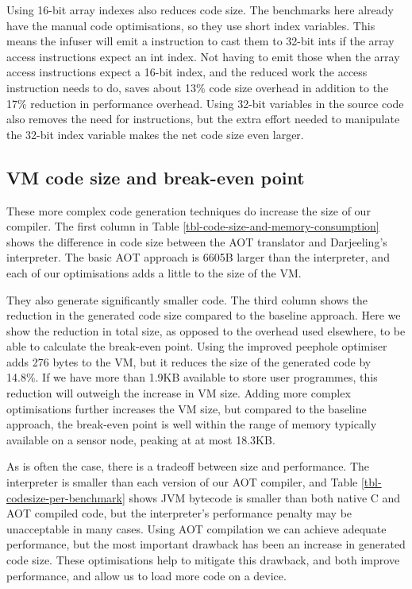 Using 16-bit array indexes also reduces code size. The benchmarks here already have the manual code optimisations, so they use short index variables. This means the infuser will emit a  instruction to cast them to 32-bit ints if the array access instructions expect an int index. Not having to emit those when the array access instructions expect a 16-bit index, and the reduced work the access instruction needs to do, saves about 13\% code size overhead in addition to the 17\% reduction in performance overhead. Using 32-bit variables in the source code also removes the need for  instructions, but the extra effort needed to manipulate the 32-bit index variable makes the net code size even larger.

\subsection{VM code size and break-even point}
These more complex code generation techniques do increase the size of our compiler. The first column in Table \ref{tbl-code-size-and-memory-consumption} shows the difference in code size between the AOT translator and Darjeeling's interpreter. The basic AOT approach is 6605B larger than the interpreter, and each of our optimisations adds a little to the size of the VM.

They also generate significantly smaller code. The third column shows the reduction in the generated code size compared to the baseline approach. Here we show the reduction in total size, as opposed to the overhead used elsewhere, to be able to calculate the break-even point. Using the improved peephole optimiser adds 276 bytes to the VM, but it reduces the size of the generated code by 14.8\%. If we have more than 1.9KB available to store user programmes, this reduction will outweigh the increase in VM size. Adding more complex optimisations further increases the VM size, but compared to the baseline approach, the break-even point is well within the range of memory typically available on a sensor node, peaking at at most 18.3KB.

As is often the case, there is a tradeoff between size and performance. The interpreter is smaller than each version of our AOT compiler, and Table \ref{tbl-codesize-per-benchmark} shows JVM bytecode is smaller than both native C and AOT compiled code, but the interpreter's performance penalty may be unacceptable in many cases. Using AOT compilation we can achieve adequate performance, but the most important drawback has been an increase in generated code size. These optimisations help to mitigate this drawback, and both improve performance, and allow us to load more code on a device.

